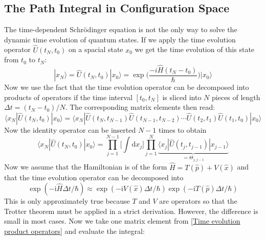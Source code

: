 \documentclass[9pt]{report}
\begin{document}
\subsection{The Path Integral in Configuration Space}
The time-dependent Schrödinger equation is not the only way to solve the dynamic time evolution of quantum states. If we apply the time evolution operator $\hat{U}(t_N,t_0)$ on a spacial state $x_0$ we get the time evolution of this state from $t_0$ to $t_N$:
\begin{equation}
|x_N\rangle = \hat{U}(t_N,t_0)|x_0\rangle =\exp\Big(\frac{-i\hat{H}(t_N-t_0)}{\hbar}\Big)|x_0\rangle
\end{equation}
Now we use the fact that the time evolution operator can be decomposed into products of operators if the time interval $[t_0,t_N]$ is sliced into $N$ pieces of length $\Delta t=(t_N-t_0)/N$. The corresponding matrix elements then read:
\begin{equation}
\langle x_N|\hat{U}(t_N,t_0)|x_0\rangle = \langle x_N|\hat{U}(t_N,t_{N-1})\hat{U}(t_{N-1},t_{N-2})\cdots\hat{U}(t_2,t_1)\hat{U}(t_1,t_0)|x_0\rangle
\end{equation}
Now the identity operator can be inserted $N-1$ times to obtain
\begin{equation}
\langle x_N|\hat{U}(t_N,t_0)|x_0\rangle = \prod_{j=1}^{N-1}\bigg[\int\mathrm{d}x_j\bigg]\prod_{j=1}^{N}\underbrace{\langle x_j|\hat{U}(t_j,t_{j-1})|x_{j-1}\rangle}_{=\Theta_{j,j-1}}\label{Time evolution product operators}
\end{equation}
Now we assume that the Hamiltonian is of the form $\hat{H}=T(\hat{p})+V(\hat{x})$ and that the time evolution operator can be decomposed into
\begin{equation}
\exp(-\mathrm{i}\hat{H}\Delta t/\hbar) \approx \exp(-\mathrm{i}V(\hat{x})\Delta t/\hbar)\exp(-\mathrm{i}T(\hat{p})\Delta t/\hbar)
\end{equation}
This is only approximately true because $T$ and $V$ are operators so that the Trotter theorem must be applied in a strict derivation. However, the difference is small in most cases. Now we take one matrix element from \eqref{Time evolution product operators} and evaluate the integral:
\end{document}
